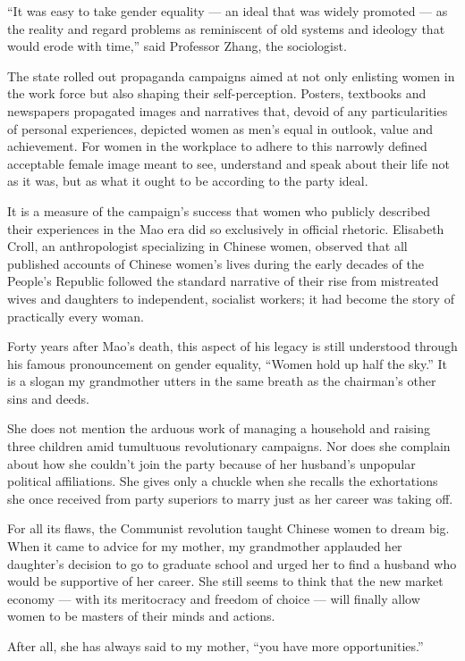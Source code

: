 ``It was easy to take gender equality --- an ideal that was widely
promoted --- as the reality and regard problems as reminiscent of old
systems and ideology that would erode with time,'' said Professor Zhang,
the sociologist.

The state rolled out propaganda campaigns aimed at not only enlisting
women in the work force but also shaping their self-perception. Posters,
textbooks and newspapers propagated images and narratives that, devoid
of any particularities of personal experiences, depicted women as men's
equal in outlook, value and achievement. For women in the workplace to
adhere to this narrowly defined acceptable female image meant to see,
understand and speak about their life not as it was, but as what it
ought to be according to the party ideal.

It is a measure of the campaign's success that women who publicly
described their experiences in the Mao era did so exclusively in
official rhetoric. Elisabeth Croll, an anthropologist specializing in
Chinese women, observed that all published accounts of Chinese women's
lives during the early decades of the People's Republic followed the
standard narrative of their rise from mistreated wives and daughters to
independent, socialist workers; it had become the story of practically
every woman.

Forty years after Mao's death, this aspect of his legacy is still
understood through his famous pronouncement on gender equality, ``Women
hold up half the sky.'' It is a slogan my grandmother utters in the same
breath as the chairman's other sins and deeds.

She does not mention the arduous work of managing a household and
raising three children amid tumultuous revolutionary campaigns. Nor does
she complain about how she couldn't join the party because of her
husband's unpopular political affiliations. She gives only a chuckle
when she recalls the exhortations she once received from party superiors
to marry just as her career was taking off.

For all its flaws, the Communist revolution taught Chinese women to
dream big. When it came to advice for my mother, my grandmother
applauded her daughter's decision to go to graduate school and urged her
to find a husband who would be supportive of her career. She still seems
to think that the new market economy --- with its meritocracy and
freedom of choice --- will finally allow women to be masters of their
minds and actions.

After all, she has always said to my mother, ``you have more
opportunities.''

